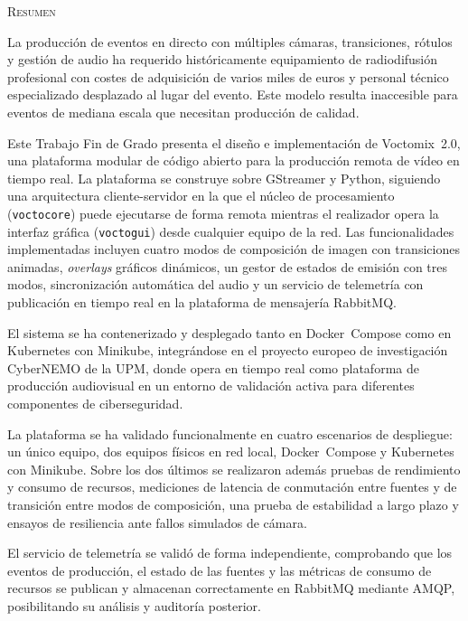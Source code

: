 \newpage
\thispagestyle{fancy}

{\Large\textsc{\textcolor{nar}{Resumen}}}
\vspace{0.2cm}

La producción de eventos en directo con múltiples cámaras, transiciones, rótulos
y gestión de audio ha requerido históricamente equipamiento de radiodifusión
profesional con costes de adquisición de varios miles de euros y personal técnico
especializado desplazado al lugar del evento. Este modelo resulta inaccesible para
eventos de mediana escala que necesitan producción de calidad.

Este Trabajo Fin de Grado presenta el diseño e implementación de Voctomix~2.0,
una plataforma modular de código abierto para la producción remota de vídeo en
tiempo real. La plataforma se construye sobre GStreamer y Python, siguiendo una
arquitectura cliente-servidor en la que el núcleo de procesamiento
(\texttt{voctocore}) puede ejecutarse de forma remota mientras el realizador opera
la interfaz gráfica (\texttt{voctogui}) desde cualquier equipo de la red. Las
funcionalidades implementadas incluyen cuatro modos de composición de imagen con
transiciones animadas, \textit{overlays} gráficos dinámicos, un gestor de estados de
emisión con tres modos, sincronización automática del audio y un servicio de
telemetría con publicación en tiempo real en la plataforma de mensajería RabbitMQ.

El sistema se ha contenerizado y desplegado tanto en Docker~Compose como en
Kubernetes con Minikube, integrándose en el proyecto europeo de investigación
CyberNEMO de la UPM, donde opera en tiempo real como plataforma de producción
audiovisual en un entorno de validación activa para diferentes componentes de
ciberseguridad.

La plataforma se ha validado funcionalmente en cuatro escenarios de despliegue: un
único equipo, dos equipos físicos en red local, Docker~Compose y Kubernetes con
Minikube. Sobre los dos últimos se realizaron además pruebas de rendimiento y
consumo de recursos, mediciones de latencia de conmutación entre fuentes y de
transición entre modos de composición, una prueba de estabilidad a largo plazo y
ensayos de resiliencia ante fallos simulados de cámara.

El servicio de telemetría se validó de forma independiente, comprobando que los
eventos de producción, el estado de las fuentes y las métricas de consumo de
recursos se publican y almacenan correctamente en RabbitMQ mediante AMQP,
posibilitando su análisis y auditoría posterior.

